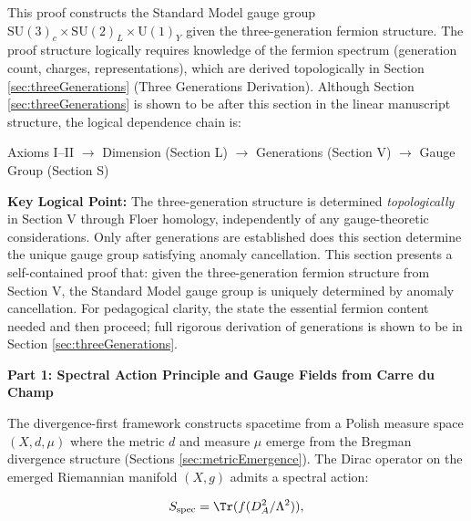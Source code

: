 

\begin{remark}
\label{rem:sectionSLogicalOrdering}

This proof constructs the Standard Model gauge group $\mathrm{SU}(3)_c \times \mathrm{SU}(2)_L \times \mathrm{U}(1)_Y$ given the three-generation fermion structure. The proof structure logically requires knowledge of the fermion spectrum (generation count, charges, representations), which are derived topologically in Section \ref{sec:threeGenerations} (Three Generations Derivation). Although Section \ref{sec:threeGenerations} is shown to be after this section in the linear manuscript structure, the logical dependence chain is:

\begin{center}
Axioms I--II $\to$ Dimension (Section L) $\to$ Generations (Section V) $\to$ Gauge Group (Section S)
\end{center}

\textbf{Key Logical Point:} The three-generation structure is determined \emph{topologically} in Section V through Floer homology, independently of any gauge-theoretic considerations. Only after generations are established does this section determine the unique gauge group satisfying anomaly cancellation. This section presents a self-contained proof that: given the three-generation fermion structure from Section V, the Standard Model gauge group is uniquely determined by anomaly cancellation. For pedagogical clarity, the state the essential fermion content needed and then proceed; full rigorous derivation of generations is shown to be in Section \ref{sec:threeGenerations}.

\end{remark}

\textbf{Part 1: Spectral Action Principle and Gauge Fields from Carre du Champ}

The divergence-first framework constructs spacetime from a Polish measure space $(X, d, \mu)$ where the metric $d$ and measure $\mu$ emerge from the Bregman divergence structure (Sections \ref{sec:metricEmergence}). The Dirac operator on the emerged Riemannian manifold $(X, g)$ admits a spectral action:

\begin{equation}
\label{eq:spectralAction}
S_{\text{spec}} = \Tr(f(D_A^2/\Lambda^2)),
\end{equation}

